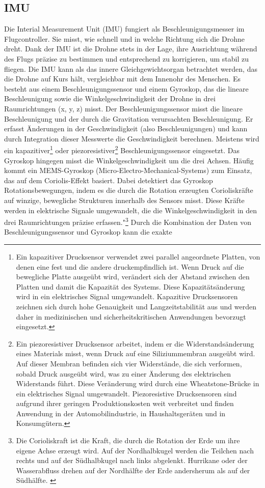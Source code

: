 \subsection{IMU}  \label{sec:IMU}
Die Interial Measurement Unit (IMU) fungiert als Beschleunigungsmesser im Flugcontroller. Sie misst, wie schnell und in welche Richtung sich die Drohne dreht. Dank der IMU ist die Drohne stets in der Lage, ihre Ausrichtung während des Flugs präzise zu bestimmen und entsprechend zu korrigieren, um stabil zu fliegen. Die IMU kann als das innere Gleichgewichtsorgan betrachtet werden, das die Drohne auf Kurs hält, vergleichbar mit dem Innenohr des Menschen. Es besteht aus einem Beschleunigungssensor und einem Gyroskop, das die lineare Beschleunigung sowie die Winkelgeschwindigkeit der Drohne in drei Raumrichtungen (x, y, z) misst. Der Beschleunigungssensor misst die lineare Beschleunigung und der durch die Gravitation verursachten Beschleunigung. Er erfasst Änderungen in der Geschwindigkeit (also Beschleunigungen) und kann durch Integration dieser Messwerte die Geschwindigkeit berechnen. Meistens wird ein kapazitiver\footnote{Ein kapazitiver Drucksensor verwendet zwei parallel angeordnete Platten, von denen eine fest und die andere druckempfindlich ist. Wenn Druck auf die bewegliche Platte ausgeübt wird, verändert sich der Abstand zwischen den Platten und damit die Kapazität des Systems. Diese Kapazitätsänderung wird in ein elektrisches Signal umgewandelt. Kapazitive Drucksensoren zeichnen sich durch hohe Genauigkeit und Langzeitstabilität aus und werden daher in medizinischen und sicherheitskritischen Anwendungen bevorzugt eingesetzt.\cite{Capacitive_vs_Piezoresistive}} oder piezoresistiver\footnote{Ein piezoresistiver Drucksensor arbeitet, indem er die Widerstandsänderung eines Materials misst, wenn Druck auf eine Siliziummembran ausgeübt wird. Auf dieser Membran befinden sich vier Widerstände, die sich verformen, sobald Druck ausgeübt wird, was zu einer Änderung des elektrischen Widerstands führt. Diese Veränderung wird durch eine Wheatstone-Brücke in ein elektrisches Signal umgewandelt.\cite{Capacitive_vs_Piezoresistive} Piezoresistive Drucksensoren sind aufgrund ihrer geringen Produktionskosten weit verbreitet und finden Anwendung in der Automobilindustrie, in Haushaltsgeräten und in Konsumgütern.} Beschleunigungssensor eingesetzt. Das Gyroskop hingegen misst die Winkelgeschwindigkeit um die drei Achsen. Häufig kommt ein MEMS-Gyroskop (Micro-Electro-Mechanical-Systems) zum Einsatz, das auf dem Coriolis-Effekt basiert. 	Dabei detektiert das Gyroskop Rotationsbewegungen, indem es die durch die Rotation erzeugten Corioliskräfte auf winzige, bewegliche Strukturen innerhalb des Sensors misst. Diese Kräfte werden in elektrische Signale umgewandelt, die die Winkelgeschwindigkeit in den drei Raumrichtungen präzise erfassen."\footnote{Die Corioliskraft ist die Kraft, die durch die Rotation der Erde um ihre eigene Achse erzeugt wird. Auf der Nordhalbkugel werden die Teilchen nach rechts und auf der Südhalbkugel nach links abgelenkt. Hurrikane oder der Wasserabfluss drehen auf der Nordhälfte der Erde andersherum als auf der Südhälfte. \cite{Coriolis}} Durch die Kombination der Daten von Beschleunigungssensor und Gyroskop kann die exakte 